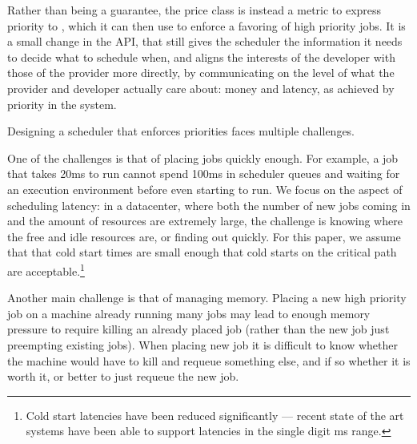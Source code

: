 Rather than being a guarantee, the price class is instead a metric to express
priority to \sys{}, which it can then use to enforce a favoring of high priority
jobs. It is a small change in the API, that still gives the scheduler the
information it needs to decide what to schedule when, and aligns the interests
of the developer with those of the provider more directly, by communicating on
the level of what the provider and developer actually care about: money and
latency, as achieved by priority in the system.




Designing a scheduler that enforces priorities faces multiple challenges. 

One of the challenges is that of placing jobs quickly enough. For example, a job
that takes 20ms to run cannot spend 100ms in scheduler queues and waiting for an
execution environment before even starting to run. We focus on the aspect of
scheduling latency: in a datacenter, where both the number of new jobs coming in
and the amount of resources are extremely large, the challenge is knowing where
the free and idle resources are, or finding out quickly. For this paper, we
assume that that cold start times are small enough that cold starts on the
critical path are acceptable.\footnote{Cold start latencies have been reduced
significantly --- recent state of the art systems have been able to support
latencies in the single digit ms range\cite{TODO}.}

Another main challenge is that of managing memory. Placing a new high priority
job on a machine already running many jobs may lead to enough memory pressure to
require killing an already placed job (rather than the new job just preempting
existing jobs). When placing new job it is difficult to know whether the machine
would have to kill and requeue something else, and if so whether it is worth it, or better
to just requeue the new job.
 
